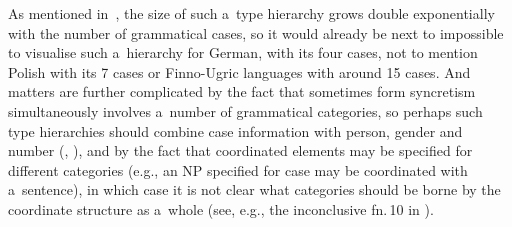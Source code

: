 \documentclass[output=paper]{langsci/langscibook}
\begin{document}
As mentioned in~\citealt[225]{lev:pol:01}, the size of such a~type hierarchy grows double exponentially with the number of grammatical cases, so it would already be next to impossible to visualise such a~hierarchy for German, with its four cases, not to mention Polish with its 7 cases or Finno-Ugric languages with around 15 cases.  And matters are further complicated by the fact that sometimes form syncretism simultaneously involves a~number of grammatical categories, so perhaps such type hierarchies should combine case information with person, gender and number (\citealt[145]{dani:01}, \citealt{Crysmann2005c}), and by the fact that coordinated elements may be specified for different categories (e.g., an NP specified for case may be coordinated with a~sentence), in which case it is not clear what categories should be borne by the coordinate structure as a~whole (see, e.g., the inconclusive fn.\,10 in \citealt[277]{sag:02}).
\end{document}
